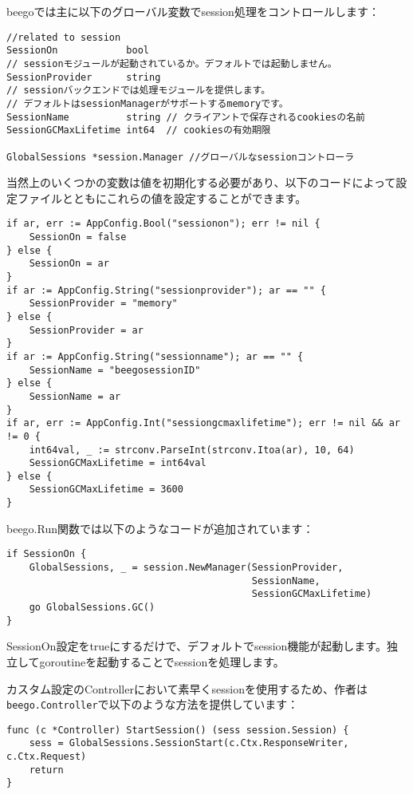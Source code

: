 beegoでは主に以下のグローバル変数でsession処理をコントロールします：

\begin{lstlisting}[numbers=none]
//related to session 
SessionOn            bool
// sessionモジュールが起動されているか。デフォルトでは起動しません。
SessionProvider      string
// sessionバックエンドでは処理モジュールを提供します。
// デフォルトはsessionManagerがサポートするmemoryです。
SessionName          string // クライアントで保存されるcookiesの名前
SessionGCMaxLifetime int64  // cookiesの有効期限

GlobalSessions *session.Manager //グローバルなsessionコントローラ
\end{lstlisting}

当然上のいくつかの変数は値を初期化する必要があり、以下のコードによって設定ファイルとともにこれらの値を設定することができます。



\begin{lstlisting}[numbers=none]
if ar, err := AppConfig.Bool("sessionon"); err != nil {
    SessionOn = false
} else {
    SessionOn = ar
}
if ar := AppConfig.String("sessionprovider"); ar == "" {
    SessionProvider = "memory"
} else {
    SessionProvider = ar
}
if ar := AppConfig.String("sessionname"); ar == "" {
    SessionName = "beegosessionID"
} else {
    SessionName = ar
}
if ar, err := AppConfig.Int("sessiongcmaxlifetime"); err != nil && ar != 0 {
    int64val, _ := strconv.ParseInt(strconv.Itoa(ar), 10, 64)
    SessionGCMaxLifetime = int64val
} else {
    SessionGCMaxLifetime = 3600
}    
\end{lstlisting}

beego.Run関数では以下のようなコードが追加されています：



\begin{lstlisting}[numbers=none]
if SessionOn {
    GlobalSessions, _ = session.NewManager(SessionProvider,
                                           SessionName,
                                           SessionGCMaxLifetime)
    go GlobalSessions.GC()
}
\end{lstlisting}

SessionOn設定をtrueにするだけで、デフォルトでsession機能が起動します。独立してgoroutineを起動することでsessionを処理します。

カスタム設定のControllerにおいて素早くsessionを使用するため、作者は\texttt{beego.Controller}で以下のような方法を提供しています：

\begin{lstlisting}[numbers=none]
func (c *Controller) StartSession() (sess session.Session) {
    sess = GlobalSessions.SessionStart(c.Ctx.ResponseWriter, c.Ctx.Request)
    return
}        
\end{lstlisting}




